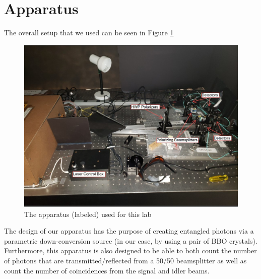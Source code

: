 \documentclass[twocolumn,amsmath,amssymb,pra]{revtex4-2}
\begin{document}
\section{Apparatus}
The overall setup that we used can be seen in Figure \ref{fig:app}
\begin{figure}[H]
    \centering
    \includegraphics[width = 0.95\linewidth]{apparatus.jpg}
    \caption{The apparatus (labeled) used for this lab}
    \label{fig:app}
\end{figure}
The design of our apparatus has the purpose of creating entangled photons via a parametric down-conversion source (in our case, by using a pair of BBO crystals). Furthermore, this apparatus is also designed to be able to both count the number of photons that are transmitted/reflected from a 50/50 beamsplitter as well as count the number of coincidences from the signal and idler beams. 
\end{document}

